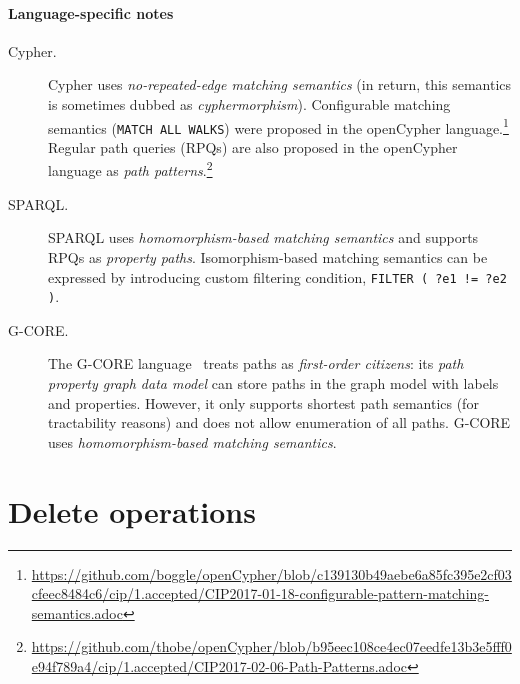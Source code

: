 \paragraph{Language-specific notes}

\begin{description}
\item[Cypher.] Cypher uses \emph{no-repeated-edge matching semantics} (in return, this semantics is sometimes dubbed as \emph{cyphermorphism}).
Configurable matching semantics (\eg \lstinline[language=cypher]{MATCH ALL WALKS}) were proposed in the openCypher language.\footnote{\url{https://github.com/boggle/openCypher/blob/c139130b49aebe6a85fc395e2cf03cfeec8484c6/cip/1.accepted/CIP2017-01-18-configurable-pattern-matching-semantics.adoc}}
Regular path queries (RPQs) are also proposed in the openCypher language as \emph{path patterns}.\footnote{\url{https://github.com/thobe/openCypher/blob/b95eec108ce4ec07eedfe13b3e5fff0e94f789a4/cip/1.accepted/CIP2017-02-06-Path-Patterns.adoc}}

\item[SPARQL.] SPARQL uses \emph{homomorphism-based matching semantics} and supports RPQs as \emph{property paths}. Isomorphism-based matching semantics can be expressed by introducing custom filtering condition, \eg \lstinline[language=sparql]{FILTER ( ?e1 != ?e2 )}.

\item[G-CORE.] The \mbox{G-CORE} language~\cite{DBLP:conf/sigmod/AnglesABBFGLPPS18} treats paths as \emph{first-order citizens}: its \emph{path property graph data model} can store paths in the graph model with labels and properties. However, it only supports shortest path semantics (for tractability reasons) and does not allow enumeration of all paths. \mbox{G-CORE} uses \emph{homomorphism-based matching semantics}.
\end{description}





\section{Delete operations}


